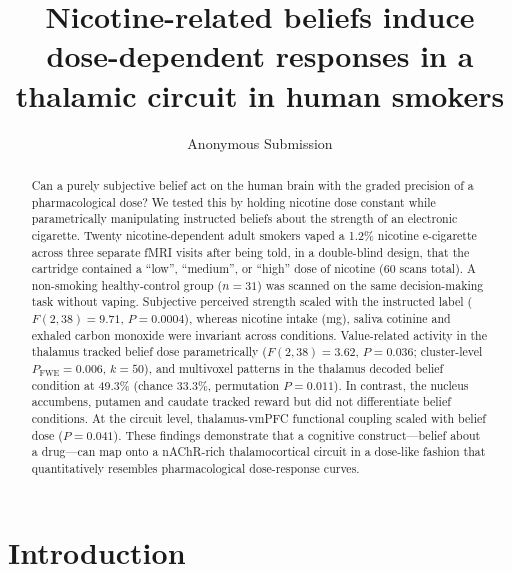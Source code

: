\documentclass[11pt]{article}
\title{Nicotine-related beliefs induce dose-dependent responses in a thalamic circuit in human smokers}
\author[1]{Anonymous Submission}
\affil[1]{Target venue: \textit{Nature Human Behaviour}}
\date{}
\begin{document}
\maketitle

\begin{abstract}
Can a purely subjective belief act on the human brain with the graded precision of a pharmacological dose? We tested this by holding nicotine dose constant while parametrically manipulating instructed beliefs about the strength of an electronic cigarette. Twenty nicotine-dependent adult smokers vaped a 1.2\% nicotine e-cigarette across three separate fMRI visits after being told, in a double-blind design, that the cartridge contained a ``low'', ``medium'', or ``high'' dose of nicotine (60 scans total). A non-smoking healthy-control group ($n=31$) was scanned on the same decision-making task without vaping. Subjective perceived strength scaled with the instructed label ($F(2,38)=9.71$, $P=0.0004$), whereas nicotine intake (mg), saliva cotinine and exhaled carbon monoxide were invariant across conditions. Value-related activity in the thalamus tracked belief dose parametrically ($F(2,38)=3.62$, $P=0.036$; cluster-level $P_\text{FWE}=0.006$, $k=50$), and multivoxel patterns in the thalamus decoded belief condition at 49.3\% (chance 33.3\%, permutation $P=0.011$). In contrast, the nucleus accumbens, putamen and caudate tracked reward but did not differentiate belief conditions. At the circuit level, thalamus-vmPFC functional coupling scaled with belief dose ($P=0.041$). These findings demonstrate that a cognitive construct---belief about a drug---can map onto a nAChR-rich thalamocortical circuit in a dose-like fashion that quantitatively resembles pharmacological dose-response curves.
\end{abstract}

\section{Introduction}
\end{document}
